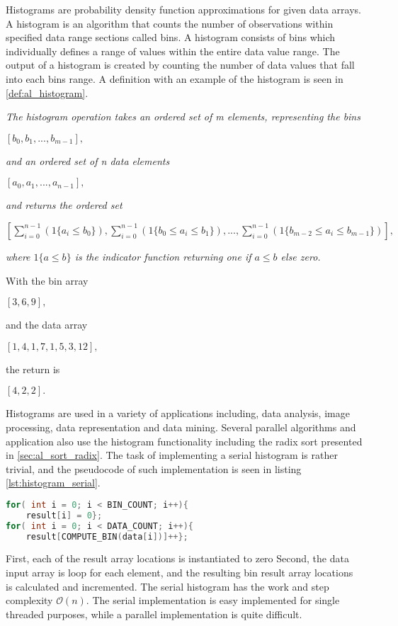 Histograms are probability density function approximations for given data arrays. A histogram is an algorithm that counts the number of observations within specified data range sections called bins. A histogram consists of bins which individually defines a range of values within the entire data value range. The output of a histogram is created by counting the number of data values that fall into each bins range. A definition with an example of the histogram is seen in \cref{def:al_histogram}.

\begin{definition}
	\label{def:al_histogram}
	\textit{The histogram operation takes an ordered set of m elements, representing the bins}
	\begin{center}
		$[b_0,b_1,...,b_{m-1}],$
	\end{center}
	\textit{and an ordered set of n data elements}
	\begin{center}
		$[a_0,a_1,...,a_{n-1}],$
	\end{center}
	\textit{and returns the ordered set}
	\begin{center}
		$[\sum_{i=0}^{n-1}(1\{ a_i \leq b_0 \}),\sum_{i=0}^{n-1}(1\{b_0 \leq a_i \leq b_1\}),...,\sum_{i=0}^{n-1}(1\{b_{m-2} \leq a_i \leq b_{m-1}\})],$
	\end{center}
	\textit{where $1\{a\leq b\}$ is the indicator function returning one if $a\leq b$ else zero.}
\end{definition}
\begin{example}
	With the bin array
		\begin{center}
		$[3,6,9],$
	\end{center}
	and the data array 
		\begin{center}
		$[1,4,1,7,1,5,3,12],$
	\end{center}
	the return is
		\begin{center}
		$[4,2,2].$
	\end{center}
\end{example}

Histograms are used in a variety of applications including, data analysis, image processing, data representation and data mining. Several parallel algorithms and application also use the histogram functionality including the radix sort presented in \cref{sec:al_sort_radix}. The task of implementing a serial histogram is rather trivial, and the pseudocode of such implementation is seen in listing \ref{lst:histogram_serial}.

\begin{lstlisting}[language=C,caption={Pseudo code serial implementaion of histogram},label=lst:histogram_serial]
for( int i = 0; i < BIN_COUNT; i++){
	result[i] = 0}; 
for( int i = 0; i < DATA_COUNT; i++){ 
	result[COMPUTE_BIN(data[i])]++}; 
\end{lstlisting}

First, each of the result array locations is instantiated to zero Second, the data input array is loop for each element, and the resulting bin result array locations is calculated and incremented. The serial histogram has the work and step complexity $\mathcal{O}(n)$. The serial implementation is easy implemented for single threaded purposes, while a parallel implementation is quite difficult. 

           